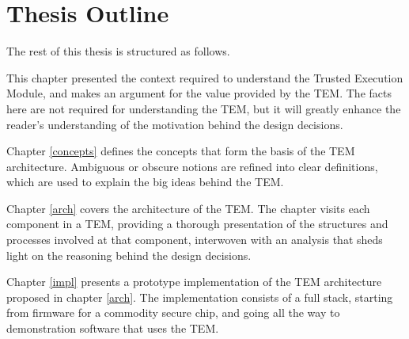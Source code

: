 \section{Thesis Outline}\label{intro:outline}
The rest of this thesis is structured as follows.

This chapter presented the context required to understand the
Trusted Execution Module, and makes an argument for the value provided by the
TEM. The facts here are not required for understanding the TEM, but it will
greatly enhance the reader's understanding of the motivation behind the design
decisions.

Chapter \ref{concepts} defines the concepts that form the basis of the TEM
architecture. Ambiguous or obscure notions are refined into clear definitions,
which are used to explain the big ideas behind the TEM.

Chapter \ref{arch} covers the architecture of the TEM. The chapter visits each
component in a TEM, providing a thorough presentation of the structures and
processes involved at that component, interwoven with an analysis that sheds
light on the reasoning behind the design decisions.

Chapter \ref{impl} presents a prototype implementation of the TEM architecture
proposed in chapter \ref{arch}. The implementation consists of a full stack,
starting from firmware for a commodity secure chip, and going all the way to
demonstration software that uses the TEM.
